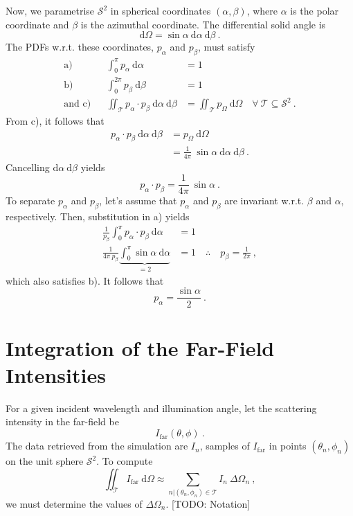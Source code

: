\documentclass[10pt]{article}
\begin{document}
Now, we parametrise $\mathcal{S}^2$ in spherical coordinates $(\alpha,\beta)$, where $\alpha$ is the polar coordinate and $\beta$ is the azimuthal coordinate. 
The differential solid angle is
$$
\mathrm{d}\Omega = \sin\alpha \ \mathrm{d}\alpha \ \mathrm{d}\beta \ .
$$
The PDFs w.r.t. these coordinates, $p_{\alpha}$ and $p_\beta$, must satisfy
$$
\begin{aligned}
\text{a)}&&
\int_0^\pi p_{\alpha} \ \mathrm{d}\alpha &= 1
\\
\text{b)}&&
\int_0^{2\pi} p_{\beta} \ \mathrm{d}\beta &= 1
\\
\text{and c)}&&
\iint_{\mathcal{T}} p_\alpha \cdot p_\beta \ \mathrm{d}\alpha\ \mathrm{d}\beta
&=
\iint_{\mathcal{T}} p_\Omega \ \mathrm{d}\Omega
\quad\forall\ \mathcal{T}\subseteq\mathcal{S}^2
\ .
\end{aligned}
$$
From \mbox{c)}, it follows that
$$
\begin{aligned}
p_\alpha \cdot p_\beta \ \mathrm{d}\alpha\ \mathrm{d}\beta &= p_\Omega \ \mathrm{d}\Omega
\\
&= \frac{1}{4\pi} \ \sin\alpha \ \mathrm{d}\alpha \ \mathrm{d}\beta \ .
\end{aligned}
$$
Cancelling $\mathrm{d}\alpha\ \mathrm{d}\beta$ yields
$$
p_\alpha \cdot p_\beta = \frac{1}{4\pi} \ \sin\alpha \ .
$$
To separate $p_\alpha$ and $p_\beta$, let's assume that $p_\alpha$ and $p_\beta$ are invariant w.r.t. $\beta$ and $\alpha$, respectively. 
Then, substitution in \mbox{a)} yields
$$
\begin{aligned}
\frac{1}{p_\beta} \int_0^\pi p_\alpha \cdot p_\beta \ \mathrm{d}\alpha &= 1
\\
\frac{1}{4\pi\ p_\beta} \underbrace{\int_0^\pi \sin\alpha \ \mathrm{d}\alpha}_{=2} &= 1
\quad\therefore\quad
p_\beta = \frac{1}{2\pi}
\ ,
\end{aligned}
$$
which also satisfies \mbox{b)}. 
It follows that 
$$p_\alpha = \frac{\sin\alpha}{2} \ .$$



\section*{Integration of the Far-Field Intensities}

For a given incident wavelength and illumination angle, let the scattering intensity in the far-field be
$$I_\mathrm{far}(\theta,\phi)\ .$$
The data retrieved from the simulation are $I_n$, samples of $I_\mathrm{far}$ in points $\left( \theta_n, \phi_n \right)$ on the unit sphere $\mathcal{S}^2$. 
To compute
$$
    \iint_{\mathcal{T}} I_\mathrm{far} \ \mathrm{d}\Omega \approx \sum_{n \vert \left( \theta_n, \phi_n \right)\in\mathcal{T}} I_n \ \Delta\Omega_n \ , 
$$
we must determine the values of $\Delta\Omega_n$. [TODO: Notation]
\end{document}
